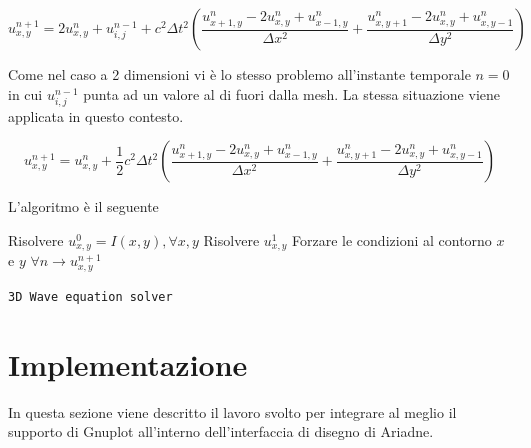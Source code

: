 \documentclass{article}
\begin{document}
\begin{equation}
u_{x,y}^{n+1} = 2u_{x,y}^n+u_{i,j}^{n-1}+c^2\Delta t^2(\frac{u_{x+1,y}^n-2u_{x,y}^n+u_{x-1,y}^n}{\Delta x^2}+\frac{u_{x,y+1}^n-2u_{x,y}^n+u_{x,y-1}^n}{\Delta y^2})
\end{equation}

Come nel caso a 2 dimensioni vi è lo stesso problemo all'instante temporale $n=0$ in cui $u_{i,j}^{n-1}$ punta ad un valore al di fuori dalla mesh. La stessa situazione viene applicata in questo contesto.

\begin{equation}
u_{x,y}^{n+1} = u_{x,y}^n + \frac{1}{2}c^2\Delta t^2(\frac{u_{x+1,y}^n-2u_{x,y}^n+u_{x-1,y}^n}{\Delta x^2}+\frac{u_{x,y+1}^n-2u_{x,y}^n+u_{x,y-1}^n}{\Delta y^2})
\end{equation}

L'algoritmo è il seguente

\begin{center}
	\begin{minipage}{0.5\linewidth} %
		\begin{algorithm}[H]
			\medskip
			Risolvere $u_{x,y}^0=I(x,y), \forall x,y$\;
			Risolvere $u_{x,y}^1$\;
			Forzare le condizioni al contorno $x$ e $y$\;
			$\forall n \rightarrow u_{x,y}^{n+1}$ \;
			\caption{\texttt{3D Wave equation solver}} %
			\label{alg:3D Wave equation solver}   %
		\end{algorithm}
	\end{minipage}
\end{center}

\section{Implementazione}
In questa sezione viene descritto il lavoro svolto per integrare al meglio il supporto di Gnuplot all'interno dell'interfaccia di disegno di Ariadne.
\end{document}

